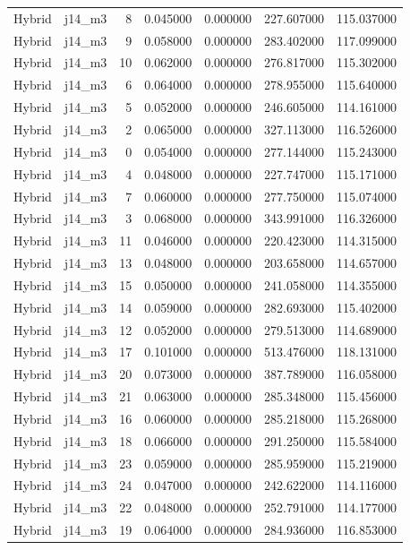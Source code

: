 \begin{tabular}{llrrrrr}
Hybrid & j14_m3 & 8 & 0.045000 & 0.000000 & 227.607000 & 115.037000 \\
Hybrid & j14_m3 & 9 & 0.058000 & 0.000000 & 283.402000 & 117.099000 \\
Hybrid & j14_m3 & 10 & 0.062000 & 0.000000 & 276.817000 & 115.302000 \\
Hybrid & j14_m3 & 6 & 0.064000 & 0.000000 & 278.955000 & 115.640000 \\
Hybrid & j14_m3 & 5 & 0.052000 & 0.000000 & 246.605000 & 114.161000 \\
Hybrid & j14_m3 & 2 & 0.065000 & 0.000000 & 327.113000 & 116.526000 \\
Hybrid & j14_m3 & 0 & 0.054000 & 0.000000 & 277.144000 & 115.243000 \\
Hybrid & j14_m3 & 4 & 0.048000 & 0.000000 & 227.747000 & 115.171000 \\
Hybrid & j14_m3 & 7 & 0.060000 & 0.000000 & 277.750000 & 115.074000 \\
Hybrid & j14_m3 & 3 & 0.068000 & 0.000000 & 343.991000 & 116.326000 \\
Hybrid & j14_m3 & 11 & 0.046000 & 0.000000 & 220.423000 & 114.315000 \\
Hybrid & j14_m3 & 13 & 0.048000 & 0.000000 & 203.658000 & 114.657000 \\
Hybrid & j14_m3 & 15 & 0.050000 & 0.000000 & 241.058000 & 114.355000 \\
Hybrid & j14_m3 & 14 & 0.059000 & 0.000000 & 282.693000 & 115.402000 \\
Hybrid & j14_m3 & 12 & 0.052000 & 0.000000 & 279.513000 & 114.689000 \\
Hybrid & j14_m3 & 17 & 0.101000 & 0.000000 & 513.476000 & 118.131000 \\
Hybrid & j14_m3 & 20 & 0.073000 & 0.000000 & 387.789000 & 116.058000 \\
Hybrid & j14_m3 & 21 & 0.063000 & 0.000000 & 285.348000 & 115.456000 \\
Hybrid & j14_m3 & 16 & 0.060000 & 0.000000 & 285.218000 & 115.268000 \\
Hybrid & j14_m3 & 18 & 0.066000 & 0.000000 & 291.250000 & 115.584000 \\
Hybrid & j14_m3 & 23 & 0.059000 & 0.000000 & 285.959000 & 115.219000 \\
Hybrid & j14_m3 & 24 & 0.047000 & 0.000000 & 242.622000 & 114.116000 \\
Hybrid & j14_m3 & 22 & 0.048000 & 0.000000 & 252.791000 & 114.177000 \\
Hybrid & j14_m3 & 19 & 0.064000 & 0.000000 & 284.936000 & 116.853000 \\

\end{tabular}
